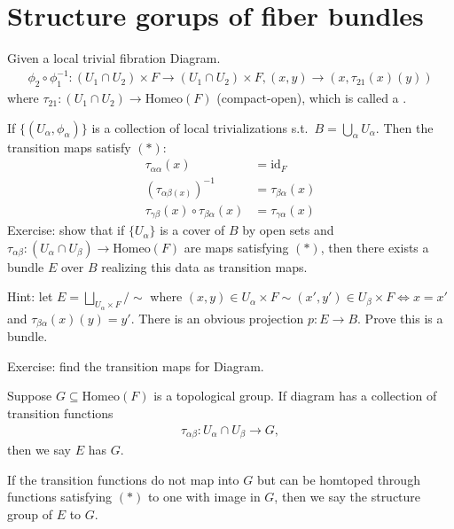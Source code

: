 \documentclass[12pt,class=article,crop=false]{standalone}
\begin{document}
\section{Structure gorups of fiber bundles}
Given a local trivial fibration Diagram.
\begin{align*}
	\phi_2 \circ \phi_1 ^{-1} : (U_1 \cap U_2) \times F \to (U_1 \cap U_2) \times F, (x,y) \to (x,\tau_{21}(x)(y))
\end{align*}
where $ \tau_{21}:(U_1 \cap U_2) \to \text{Homeo}(F)$ (compact-open), which is called a .

\begin{remark}
If $ \{(U_{ \alpha}, \phi_{ \alpha})\} $ is a collection of local trivializations s.t.\ $ B = \bigcup_{ \alpha} U_{ \alpha} $. Then the transition maps satisfy $ (*)$:
\begin{align*}
	\tau_{ \alpha \alpha}(x) &= \text{id}_{ F}\\
	(\tau_{ \alpha \beta(x)})^{-1}&= \tau_{ \beta \alpha}(x) \\
	\tau_{ \gamma \beta}(x) \circ \tau_{ \beta \alpha}(x) &= \tau_{ \gamma \alpha}(x)
\end{align*}
Exercise: show that if $ \{U_{ \alpha}\} $ is a cover of $ B$ by open sets and  $ \tau_{ \alpha \beta}:(U_{ \alpha} \cap U_{ \beta}) \to \text{Homeo}(F) $ are maps satisfying $ (*)$, then there exists a bundle  $ E$ over  $ B$ realizing this data as transition maps.

Hint: let $ E = \bigsqcup_{ U_{ \alpha} \times F} / \sim$ where $ (x,y) \in U_{ \alpha} \times F \sim (x',y') \in U_{ \beta}\times F \iff x=x'$ and $ \tau_{ \beta \alpha}(x)(y)=y'$. There is an obvious projection $ p: E \to B$. Prove this is a bundle. 
\end{remark}

Exercise: find the transition maps for Diagram.

 \begin{defn}
Suppose $ G \subseteq \text{Homeo}(F) $ is a topological group. If diagram has a collection of transition functions
\begin{align*}
	\tau_{ \alpha \beta}: U_{ \alpha} \cap U_{ \beta} \to G,
\end{align*}
then we say $ E$ has   $ G$. 

If the transition functions do not map into $ G$ but can be homtoped through functions satisfying  $ (*)$ to one with image in  $ G$, then we say the structure group of  $ E$   to $ G$. 
\end{defn}
\end{document}
